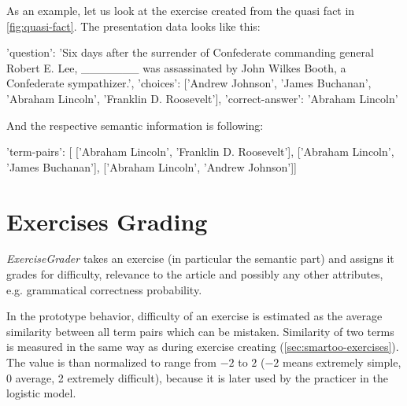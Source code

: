 \documentclass[12pt, twoside]{fithesis2}
\renewcommand{\_}{\leavevmode \kern0.07em\vbox{\hrule width0.4em}}
\newcounter{choice}
\renewcommand\thechoice{\Alph{choice}}
\newcommand\choicelabel{\thechoice.}
\newenvironment{choices}%
  {\vspace{0.8em}\list{\choicelabel}%
     {\usecounter{choice}\def\makelabel##1{\hss\llap{##1}}%
       \settowidth{\leftmargin}{W.\hskip\labelsep\hskip 0.01em}%
       \def\choice{%
         \item
       } %
       \labelwidth\leftmargin\advance\labelwidth-\labelsep
       \topsep=0pt
       \partopsep=0pt
     }%
  }%
  {\vspace{-0.7em}\endlist}
\newenvironment{question}
{
  \begin{center}
  \vspace{-0.5em}
  \begin{tabular}{p{0.9\textwidth}}
}
{
  \\
  \end{tabular}
  \vspace{-1em}
  \end{center}
}
\newcommand{\sentenceGap}{\rule{1.5cm}{0.4pt}~}
\begin{document}
As an example, let us look at the exercise created from the quasi fact in \autoref{fig:quasi-fact}. The presentation data looks like this:
\begin{code}
{'question': 'Six days after the surrender of Confederate commanding
               general Robert E. Lee, _______ was assassinated by
               John Wilkes Booth, a Confederate sympathizer.',
'choices': ['Andrew Johnson', 'James Buchanan',
             'Abraham Lincoln', 'Franklin D. Roosevelt'],
'correct-answer': 'Abraham Lincoln'}
\end{code}



\noindent
And the respective semantic information is following:
\begin{code}
{'term-pairs': [
    ['Abraham Lincoln', 'Franklin D. Roosevelt'],
    ['Abraham Lincoln', 'James Buchanan'],
    ['Abraham Lincoln', 'Andrew Johnson']]}
\end{code}

\section{Exercises Grading}
\label{sec:smartoo-exercises-grading}

\textit{ExerciseGrader} takes an exercise (in particular the semantic part) and assigns it grades for difficulty, relevance to the article and possibly any other attributes, e.g. grammatical correctness probability.

In the prototype behavior, difficulty of an exercise is estimated as the average similarity between all term pairs which can be mistaken.
Similarity of two terms is measured in the same way as during exercise creating (\autoref{sec:smartoo-exercises}).
The value is than normalized to range from $-2$ to $2$
($-2$ means extremely simple, 0 average, 2 extremely difficult),
because it is later used by the practicer in the logistic model.
\end{document}
